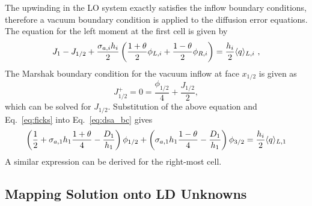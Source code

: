 The upwinding in the LO system exactly satisfies the inflow boundary conditions, therefore
a vacuum boundary condition is applied to the diffusion error equations.  The equation for the left moment
at the first cell is given by
\begin{equation}\label{eq:dsa_bc}
    J_{1} - J_{1/2}  + \frac{\sigma_{a,i}h_i}{2} \left(\frac{1+\theta}{2} \phi_{L,i}
    + \frac{1-\theta}{2}
    \phi_{R,i} \right) = \frac{h_i}{2} \langle q \rangle_{L,i}\,\,,
\end{equation}
The Marshak boundary condition for the vacuum inflow at face $x_{1/2}$ is given as
\begin{equation}
    J^+_{1/2} = 0 = \frac{\phi_{1/2}}{4} + \frac{J_{1/2}}{2},
\end{equation}
which can be solved for $J_{1/2}$.  Substitution of the above equation and
Eq.~\eqref{eq:ficks} into Eq.~\eqref{eq:dsa_bc} gives 
\begin{equation}\label{eq:bc_dsa}
    \left(\frac{1}{2}+ \sigma_{a,1}h_1\frac{1+\theta}{4} - \frac{D_1}{h_1}\right)\phi_{1/2} +
    \left( {\sigma_{a,1}{h_1}}\frac{1-\theta}{4} - \frac{D_1}{h_1}  \right)\phi_{3/2} =
    \frac{h_i}{2} \langle q \rangle_{L,1}
\end{equation}
A similar expression can be derived for the right-most cell.

\subsection{Mapping Solution onto LD Unknowns}

